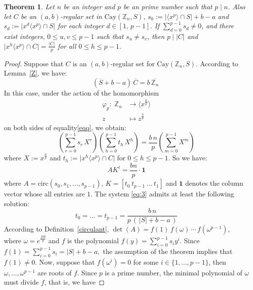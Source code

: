 \documentclass[12pt]{article}
\newtheorem{thm}[formula]{Theorem}
\begin{document}
	\begin{thm}\label{khi3}
		Let $n$ be an integer and $p$ be an prime number such that  $p \mid n$. Also let $C$ be an $(a,b)$-regular set in $\mathrm{Cay}(\mathbb{Z}_n, S)$, $s_0 := \lvert \langle x^p \rangle \cap S \rvert + b - a$ and
		$s_d := \lvert x^d \langle x^p \rangle \cap S \rvert$ for each integer $d \in [1,\, p-1]$. If $\sum_{d=0}^{p-1}s_d\neq 0$, and there exist integers, $0 \leq u,v \leq p-1$ such that $s_u \neq s_v$, then $p \mid |C|$ and
		$\lvert x^h \langle x^p \rangle \cap C \rvert = \frac{|C|}{p}$ for all \(0 \le h \le p-1\).
	\end{thm}
	\begin{proof}
		Suppose that \(C\) is an \((a,b)\)-regular set for \(\mathrm{Cay}(\mathbb{Z}_n,S)\). According to Lemma~\ref{Z}, we have:
		\begin{equation}\label{eqq}
		(\overline{S}+b-a)\,\overline{C} = b\,\overline{\mathbb{Z}_n}\
			\end{equation}
	 In this case, under the action of the homomorphism
		\[
		\begin{aligned}
			\varphi_p :\; \mathbb{Z}_n &\longrightarrow \langle x^{\frac{n}{p}}\rangle \\
			z &\longmapsto z^{\frac{n}{p}}
		\end{aligned}
		\]
		on both sides of equality\eqref{eqq}, we obtain:
		\[
		\left( \sum_{r=0}^{p-1} s_r\, X^{r} \right)
		\left( \sum_{h=0}^{p-1} t_h\, X^{h} \right)
		= \frac{b\,n}{p} \left( \sum_{m=0}^{p-1} X^{m} \right)
		\]
		where $X := x^{\frac{n}{p}}$ and $t_h := \lvert x^h \langle x^p \rangle \cap C \rvert$ for $ 0 \le h \le p-1$.
So we have:
		\begin{equation}\label{eq:3}
			A K^t = \frac{b n}{p} \cdot \mathbf{1}
		\end{equation}
		where $A=\mathrm{circ}(s_0,s_1,\ldots,s_{p-1})$, $K=[t_0\ t_{p-1}\ \ldots\ t_1]$ and $\mathbf{1}$ denotes the column vector whose all entries are $1$.
		The system \eqref{eq:3} admits at least the following solution:
		\[
		t_0 = \dots = t_{p-1} = \frac{b\,n}{p\,(\,|S| + b - a\,)}
		\]
        According to Definition~\ref{circulant},
		$\det(A) = f(1)\, f(\omega)\, \cdots\, f(\omega^{p-1})$,
		where \(\omega = e^{\frac{2\pi \mathbf{i}}{p}}\) and $f$ is the polynomial \(f(y)=\sum_{i=0}^{p-1} s_i y^i\). Since
		$
		f(1)=\sum_{i=0}^{p-1}s_i=|S|+b-a,
		$
		the assumption of the theorem implies that
		$
		f(1)\neq 0.
		$ Now, suppose that \(f(\omega^{i}) = 0\) for some \(i \in \{1,\ldots,p-1\}\), then \(\omega, \ldots, \omega^{p-1}\) are roots of \(f\). Since \(p\) is a prime number, the minimal polynomial of \(\omega\) must divide \(f\), that is, we have

\end{proof}
\end{document}
